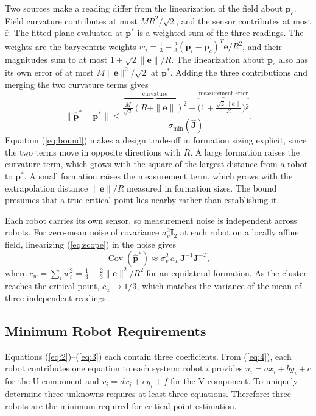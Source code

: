 \documentclass[lettersize,journal]{IEEEtran}
\begin{document}
Two sources make a reading differ from the linearization of the field about $\mathbf{p}_c$. Field curvature contributes at most $MR^2/\sqrt{2}$, and the sensor contributes at most $\bar{\varepsilon}$. The fitted plane evaluated at $\mathbf{p}^*$ is a weighted sum of the three readings. The weights are the barycentric weights $w_i = \frac{1}{3} - \frac{2}{3}(\mathbf{p}_i - \mathbf{p}_c)^T\mathbf{e}/R^2$, and their magnitudes sum to at most $1 + \sqrt{2}\|\mathbf{e}\|/R$. The linearization about $\mathbf{p}_c$ also has its own error of at most $M\|\mathbf{e}\|^2/\sqrt{2}$ at $\mathbf{p}^*$. Adding the three contributions and merging the two curvature terms gives
\begin{equation}\label{eq:bound}
\|\hat{\mathbf{p}}^* - \mathbf{p}^*\| \le \frac{\overbrace{\tfrac{M}{\sqrt{2}}(R + \|\mathbf{e}\|)^2}^{\text{curvature}} + \overbrace{\bigl(1 + \tfrac{\sqrt{2}\|\mathbf{e}\|}{R}\bigr)\bar{\varepsilon}}^{\text{measurement error}}}{\sigma_{\min}(\hat{\mathbf{J}})}.
\end{equation}
Equation (\ref{eq:bound}) makes a design trade-off in formation sizing explicit, since the two terms move in opposite directions with $R$. A large formation raises the curvature term, which grows with the square of the largest distance from a robot to $\mathbf{p}^*$. A small formation raises the measurement term, which grows with the extrapolation distance $\|\mathbf{e}\|/R$ measured in formation sizes. The bound presumes that a true critical point lies nearby rather than establishing it.

Each robot carries its own sensor, so measurement noise is independent across robots. For zero-mean noise of covariance $\sigma_v^2\mathbf{I}_2$ at each robot on a locally affine field, linearizing (\ref{eq:scope}) in the noise gives
\begin{equation}\label{eq:cov}
\operatorname{Cov}(\hat{\mathbf{p}}^*) \approx \sigma_v^2\, c_w\, \mathbf{J}^{-1}\mathbf{J}^{-T},
\end{equation}
where $c_w = \sum_i w_i^2 = \frac{1}{3} + \frac{2}{3}\|\mathbf{e}\|^2/R^2$ for an equilateral formation. As the cluster reaches the critical point, $c_w \to 1/3$, which matches the variance of the mean of three independent readings.


\subsection{Minimum Robot Requirements}

Equations (\ref{eq:2})--(\ref{eq:3}) each contain three coefficients. From (\ref{eq:4}), each robot contributes one equation to each system: robot $i$ provides $u_i = ax_i + by_i + c$ for the U-component and $v_i = dx_i + ey_i + f$ for the V-component. To uniquely determine three unknowns requires at least three equations. Therefore: three robots are the minimum required for critical point estimation.
\end{document}
